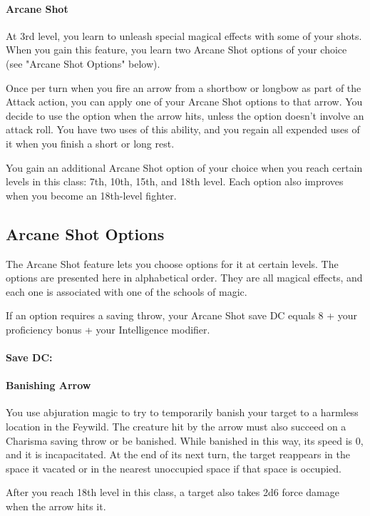 \documentclass[letterpaper,openany,oneside,twocolumn]{book}
\begin{document}
\paragraph*{Arcane Shot}
At 3rd level, you learn to unleash special magical effects with some of your shots. When you gain this feature, you learn two Arcane Shot options of your choice (see "Arcane Shot Options" below).

Once per turn when you fire an arrow from a shortbow or longbow as part of the Attack action, you can apply one of your Arcane Shot options to that arrow. You decide to use the option when the arrow hits, unless the option doesn’t involve an attack roll. You have two uses of this ability, and you regain all expended uses of it when you finish a short or long rest.

You gain an additional Arcane Shot option of your choice when you reach certain levels in this class: 7th, 10th, 15th, and 18th level. Each option also improves when you become an 18th-level fighter.
\subsection*{Arcane Shot Options}
The Arcane Shot feature lets you choose options for it at certain levels. The options are presented here in alphabetical order. They are all magical effects, and each one is associated with one of the schools of magic.

If an option requires a saving throw, your Arcane Shot save DC equals 8 + your proficiency bonus + your Intelligence modifier.\\\\
\textbf{Save DC: }

\eject

\paragraph{Banishing Arrow} You use abjuration magic to try to temporarily banish your target to a harmless location in the Feywild. The creature hit by the arrow must also succeed on a Charisma saving throw or be banished. While banished in this way, its speed is 0, and it is incapacitated. At the end of its next turn, the target reappears in the space it vacated or in the nearest unoccupied space if that space is occupied.

After you reach 18th level in this class, a target also takes 2d6 force damage when the arrow hits it.
\end{document}
